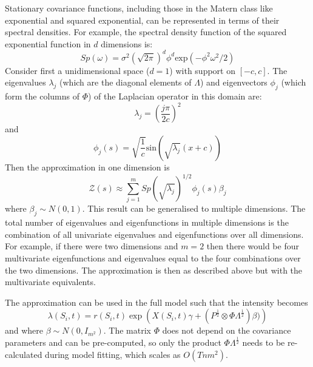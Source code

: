 Stationary covariance functions, including those in the Matern class like exponential and squared exponential, can be represented in terms of their spectral densities. For example, the spectral density function of the squared exponential function in $d$ dimensions is:
\begin{equation*}
Sp(\omega) = \sigma^2 (\sqrt{2\pi})^d \phi^d \text{exp}(-\phi^2 \omega^2/2)
\end{equation*}
Consider first a unidimensional space ($d=1$) with support on $[-c,c]$. The eigenvalues $\lambda_j$ (which are the diagonal elements of $\Lambda$) and eigenvectors $\phi_j$ (which form the columns of $\Phi$) of the Laplacian operator in this domain are:
\begin{equation*}
\lambda_j = \left( \frac{j\pi}{2c} \right)^2 
\end{equation*}
and
\begin{equation*}
\phi_j(s) = \sqrt{\frac{1}{c}} \text{sin}\left(  \sqrt{\lambda_j}(x+c) \right)
\end{equation*}
Then the approximation in one dimension is
\begin{equation*}
\mathcal{Z}(s) \approx \sum_{j=1}^m Sp\left(\sqrt{\lambda_j}\right)^{1/2}\phi_j(s)\beta_j
\end{equation*}
where $\beta_j \sim N(0,1)$. This result can be generalised to multiple dimensions. The total number of eigenvalues and eigenfunctions in multiple dimensions is the combination of all univariate eigenvalues and eigenfunctions over all dimensions. For example, if there were two dimensions and $m=2$ then there would be four multivariate eigenfunctions and eigenvalues equal to the four combinations over the two dimensions. The approximation is then as described above but with the multivariate equivalents.

The approximation can be used in the full model such that the intensity becomes
\begin{equation}
\label{eq:hsgpapprox}
    \lambda(S_i,t) = r(S_i,t)\exp\left(X(S_i,t)\gamma + (P^{\frac{1}{2}} \otimes \Phi\Lambda^{\frac{1}{2}}) \beta) \right)
\end{equation}
and where $\beta \sim N(0,I_{m^2})$. The matrix $\Phi$ does not depend on the covariance parameters and can be pre-computed, so only the product $\Phi\Lambda^{\frac{1}{2}}$ needs to be re-calculated during model fitting, which scales as $O(Tnm^2)$.

